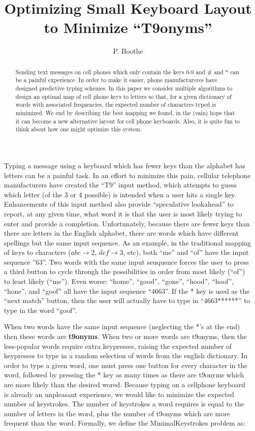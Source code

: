 \documentclass{article}
\title{Optimizing Small Keyboard Layout to Minimize ``T9onyms''}
\author{P. Boothe}
\newcommand{\newword}[1]{{\bf #1}}
\begin{document}
\maketitle

\begin{abstract}
Sending text messages on cell phones which only contain the keys 0-9 and \#
and * can be a painful experience.  In order to make it easier, phone
manufactureres have designed predictive typing schemes.  In this paper we
consider multiple algorithms to design an optimal map of cell phone keys to
letters so that, for a given dictionary of words with associated frequencies,
the expected number of characters typed is minimized.  We end by describing the
best mapping we found, in the (vain) hope that it can become a new alternative
layout for cell phone keyboards.  Also, it is quite fun to think about how one
might optimize this system.
\end{abstract}


Typing a message using a keyboard which has fewer keys than the alphabet has
letters can be a painful task.  In an effort to minimize this pain, cellular
telephone manufacturers have created the ``T9'' input method, which attempts to
guess which letter (of the 3 or 4 possible) is intended when a user hits a
single key.  Enhancements of this input method also provide ``speculative
lookahead'' to report, at any given time, what word it is that the user is
most likely trying to enter and provide a completion.  Unfortunately, because there are fewer keys than there are letters in the English alphabet, there are words which have different spellings but the same input sequence.  As an example, in the traditional mapping of keys to characters ($abc\to 2$, $def\to3$, etc), both ``me'' and ``of'' have the input sequence ''63''.  Two words with the same input seuquence forces the user to press a third button to cycle through the possibilities in order from most likely (``of'') to least likely (``me'').  Even worse: ``home'', ``good'', ``gone'', ``hood'', ``hoof'', ``hone'', and ``goof'' all have the input sequence ``4663''.  If the * key is used as the ``next match'' button, then the user will actually have to type in ``4663******'' to type in the word ``goof''.

When two words have the same input sequence (neglecting the *'s at the end) then these words are \newword{t9onyms}.  When two or more words are t9onyms, then the less-popular words require extra keypresses, raising the expected number of keypresses to type in a random selection of words from the english dictionary.  In order to type a given word, one must press one button for every character in the word, followed by pressing the * key as many times as there are t9onyms which are more likely than the desired wored.  Because typing on a cellphone keyboard is already an unpleasant experience, we would like to minimize the expected number of keystrokes.  The number of keystrokes a word requires is equal to the number of letters in the word, plus the number of t9onyms which are more frequent than the word.  Formally, we define the {\sc MinimalKeystrokes} problem as:
\end{document}
